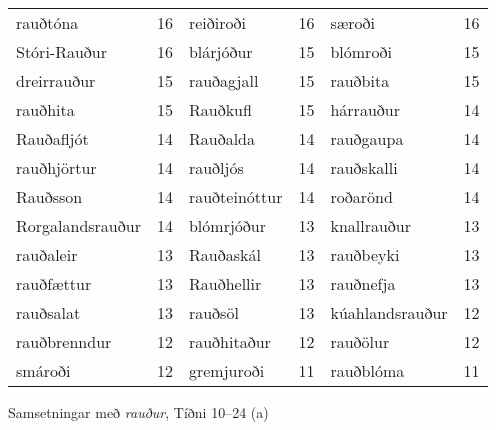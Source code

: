 \documentclass[../samsetningasafn.tex]{subfiles}
\begin{document}
\begin{wordlist}[H]
\begin{tcolorbox}
\begin{tabular}{BlBlBl}
		rauðtóna			& 16		& 
		reiðiroði			& 16		& 
		særoði			& 16		\\ 	 %
		Stóri-Rauður		& 16		& 	
		blárjóður		& 15		& 
		blómroði		& 15		\\  %
		dreirrauður		& 15		& 	
		rauðagjall		& 15		& 
		rauðbita			& 15		\\  %
		rauðhita			& 15		& 
		Rauðkufl			& 15		& 	
		hárrauður		& 14		\\  %
		Rauðafljót		& 14		& 
		Rauðalda		& 14		& 
		rauðgaupa		& 14		\\ 	%
		rauðhjörtur		& 14		& 	
		rauðljós			& 14		& 	
		rauðskalli 		& 14		\\  %
		Rauðsson		& 14		& 	
		rauðteinóttur		& 14		& 
		roðarönd		& 14		\\ 	%
		Rorgalandsrauður & 14		& 	
		blómrjóður		& 13		& 	
		knallrauður		& 13		\\ 	%
		rauðaleir			& 13		& 
		Rauðaskál		& 13		& 	
		rauðbeyki		& 13		\\ 	%
		rauðfættur		& 13		& 	
		Rauðhellir		& 13		& 		
		rauðnefja		& 13		\\ 	%
		rauðsalat		& 13		& 	
		rauðsöl			& 13		& 	
		kúahlandsrauður	& 12		\\  %
		rauðbrenndur	& 12		& 
		rauðhitaður		& 12		& 	
		rauðölur			& 12		\\  %
		smároði			& 12		& 
		gremjuroði		& 11		& 	
		rauðblóma		& 11		  %
	\end{tabular}

\end{tcolorbox}
	\caption{Samsetningar með \textit{rauður}, Tíðni 10--24 (a)}
	\label{listi:rautt.10a}
\end{wordlist}	
		
\end{document}
